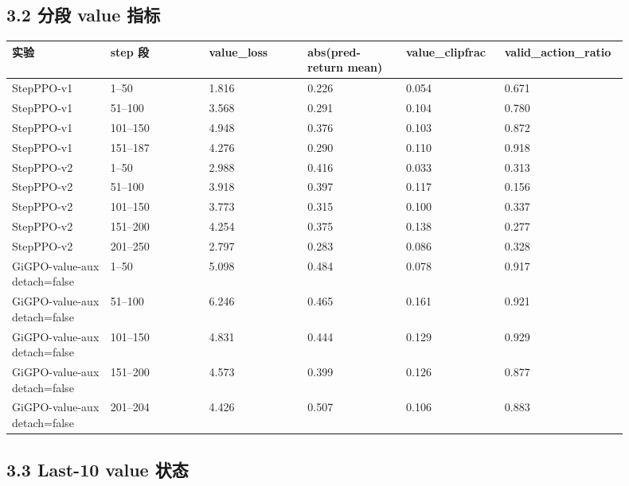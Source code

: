 \documentclass[10pt]{ctexart}
\begin{document}
\subsection*{3.2 分段 value 指标}

\begin{small}
\begin{longtable}{@{}p{0.15\linewidth}p{0.15\linewidth}p{0.15\linewidth}p{0.15\linewidth}p{0.15\linewidth}p{0.15\linewidth}@{}}
\toprule
实验 & step 段 & value\_loss & abs(pred-return mean) & value\_clipfrac & valid\_action\_ratio \\
\midrule
StepPPO-v1 & 1--50 & 1.816 & 0.226 & 0.054 & 0.671 \\
StepPPO-v1 & 51--100 & 3.568 & 0.291 & 0.104 & 0.780 \\
StepPPO-v1 & 101--150 & 4.948 & 0.376 & 0.103 & 0.872 \\
StepPPO-v1 & 151--187 & 4.276 & 0.290 & 0.110 & 0.918 \\
StepPPO-v2 & 1--50 & 2.988 & 0.416 & 0.033 & 0.313 \\
StepPPO-v2 & 51--100 & 3.918 & 0.397 & 0.117 & 0.156 \\
StepPPO-v2 & 101--150 & 3.773 & 0.315 & 0.100 & 0.337 \\
StepPPO-v2 & 151--200 & 4.254 & 0.375 & 0.138 & 0.277 \\
StepPPO-v2 & 201--250 & 2.797 & 0.283 & 0.086 & 0.328 \\
GiGPO-value-aux detach=false & 1--50 & 5.098 & 0.484 & 0.078 & 0.917 \\
GiGPO-value-aux detach=false & 51--100 & 6.246 & 0.465 & 0.161 & 0.921 \\
GiGPO-value-aux detach=false & 101--150 & 4.831 & 0.444 & 0.129 & 0.929 \\
GiGPO-value-aux detach=false & 151--200 & 4.573 & 0.399 & 0.126 & 0.877 \\
GiGPO-value-aux detach=false & 201--204 & 4.426 & 0.507 & 0.106 & 0.883 \\
\bottomrule
\end{longtable}
\end{small}


\subsection*{3.3 Last-10 value 状态}
\end{document}
